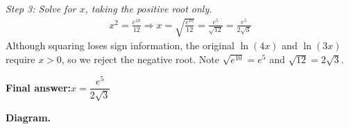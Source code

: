 \documentclass[11pt]{article}
\begin{document}
\textit{Step 3: Solve for \( x \), taking the positive root only.}
\[\begin{gathered}
x^2 = \frac{e^{10}}{12} \Rightarrow x = \sqrt{\frac{e^{10}}{12}} = \frac{e^5}{\sqrt{12}} = \frac{e^5}{2\sqrt{3}}
\end{gathered}\]
Although squaring loses sign information, the original \( \ln(4x) \) and \( \ln(3x) \) require \( x > 0 \), so we reject the negative root. Note \( \sqrt{e^{10}} = e^5 \) and \( \sqrt{12} = 2\sqrt{3} \).

\begin{answerbox}
\textbf{Final answer:}\quad \(\displaystyle  x = \dfrac{e^5}{2\sqrt{3}} \)
\end{answerbox}
\textbf{Diagram.}

\begin{center}
\end{center}
\end{document}
